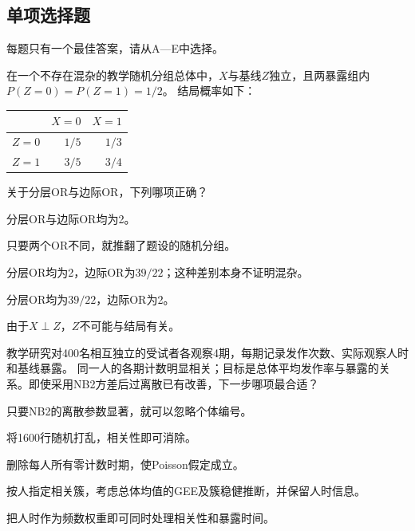 \subsection{单项选择题}
每题只有一个最佳答案，请从A—E中选择。

\par\noindent\begin{minipage}{\linewidth}
在一个不存在混杂的教学随机分组总体中，$X$与基线$Z$独立，且两暴露组内$P(Z=0)=P(Z=1)=1/2$。
结局概率如下：
\begin{center}\begin{tabular}{lrr}\toprule&$X=0$&$X=1$\\\midrule
$Z=0$&$1/5$&$1/3$\\$Z=1$&$3/5$&$3/4$\\\bottomrule\end{tabular}\end{center}
关于分层OR与边际OR，下列哪项正确？
\begin{choices}
\item 分层OR与边际OR均为2。
\item 只要两个OR不同，就推翻了题设的随机分组。
\item 分层OR均为2，边际OR为$39/22$；这种差别本身不证明混杂。
\item 分层OR均为$39/22$，边际OR为2。
\item 由于$X\perp Z$，$Z$不可能与结局有关。
\end{choices}
\end{minipage}\par\medskip

\par\noindent\begin{minipage}{\linewidth}
教学研究对400名相互独立的受试者各观察4期，每期记录发作次数、实际观察人时和基线暴露。
同一人的各期计数明显相关；目标是总体平均发作率与暴露的关系。即使采用NB2方差后过离散已有改善，下一步哪项最合适？
\begin{choices}
\item 只要NB2的离散参数显著，就可以忽略个体编号。
\item 将1600行随机打乱，相关性即可消除。
\item 删除每人所有零计数时期，使Poisson假定成立。
\item 按人指定相关簇，考虑总体均值的GEE及簇稳健推断，并保留人时信息。
\item 把人时作为频数权重即可同时处理相关性和暴露时间。
\end{choices}
\end{minipage}\par\medskip

